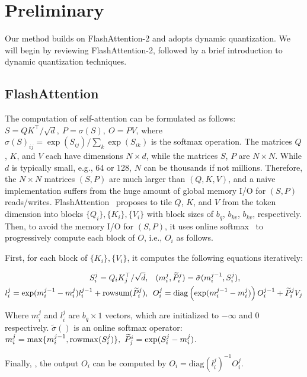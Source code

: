 
\section{Preliminary}

Our method builds on FlashAttention-2 and adopts dynamic quantization.  We will begin by reviewing FlashAttention-2, followed by a brief introduction to dynamic quantization techniques.


\subsection{FlashAttention} \label{sec:flash_attn}

The computation of self-attention can be formulated as follows: $S = Q K^\top/\sqrt{d},~P = \sigma(S),~O = P V$, where $\sigma(S)_{ij} = \exp(S_{ij})/\sum_{k} \exp(S_{ik})$ is the softmax operation.
The matrices $Q$, $K$, and $V$ each have dimensions $N \times d$, while the matrices $S$, $P$ are $N \times N$. While $d$ is typically small, e.g., 64 or 128, $N$ can be thousands if not millions. Therefore, the $N\times N$ matrices $(S, P)$ are much larger than $(Q, K, V)$, and a naive implementation suffers from the huge amount of global memory I/O for $(S, P)$ reads/writes. FlashAttention~\citep{dao2023flashattention} proposes to tile $Q$, $K$, and $V$ from the token dimension into blocks $\{Q_i\}, \{K_i\}, \{V_i\}$ with block sizes of $b_q$, $b_{kv}$, $b_{kv}$, respectively. Then, to avoid the memory I/O for $(S, P)$, it uses online softmax~\citep{milakov2018online} to progressively compute each block of $O$, i.e., $O_i$ as follows.

First, for each block of $\{K_i\}, \{V_i\}$, it computes the following equations iteratively:

\begin{align}
 S^j_i = Q_i K_j^\top / \sqrt{d},& ~~~(m^{j}_i, \widetilde P^j_i) = \tilde\sigma(m^{j-1}_i, S^j_i),  \\
 l_i^j = \exp(m^{\textcolor{black}{{j-1}}}_i-m^{\textcolor{black}{{j}}}_i) l_i^{j-1} + \mathrm{rowsum}(\widetilde P^j_i),& ~~O^j_i=\mathrm{diag}\left(\exp(m^{\textcolor{black}{{j-1}}}_i-m^{\textcolor{black}{{j}}}_i)\right) O^{j-1}_i + \widetilde P^j_i V_j 
\end{align}


Where $m_i^j$ and $l_i^j$ are $b_q \times 1$ vectors, which are initialized to $- \infty$ and $0$ respectively. $\tilde \sigma()$ is an online softmax operator: $m^j_i = \max\{m^{j-1}_i, \mathrm{rowmax}(S^j_i)\},~\widetilde P_j^i=\exp(S^j_i-m^j_i)$.

Finally, , the output $O_i$ can be computed by $O_i = \mathrm{diag}(l_i^j)^{-1} O_i^j$.


